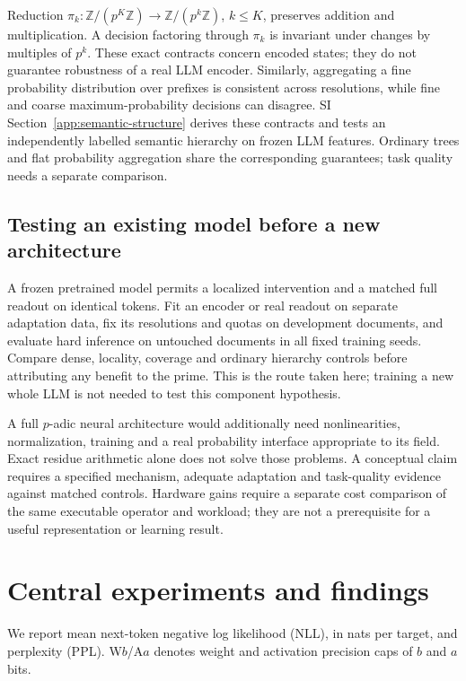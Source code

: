 \documentclass[11pt]{article}
\newcommand{\Z}{\mathbb{Z}}
\begin{document}
Reduction \(\pi_k:\Z/(p^K\Z)\to\Z/(p^k\Z)\), \(k\leq K\),
preserves addition and multiplication. A decision factoring through \(\pi_k\)
is invariant under changes by multiples of \(p^k\). These exact contracts
concern encoded states; they do not guarantee robustness of a real LLM
encoder. Similarly, aggregating a fine probability distribution over prefixes
is consistent across resolutions, while fine and coarse maximum-probability
decisions can disagree. SI Section~\ref{app:semantic-structure} derives these
contracts and tests an independently labelled semantic hierarchy on frozen
LLM features. Ordinary trees and flat probability aggregation share the
corresponding guarantees; task quality needs a separate comparison.

\subsection{Testing an existing model before a new architecture}

A frozen pretrained model permits a localized intervention and a matched
full readout on identical tokens. Fit an encoder or real readout on separate
adaptation data, fix its resolutions and quotas on development documents,
and evaluate hard inference on untouched documents in all fixed training
seeds. Compare dense, locality, coverage and ordinary hierarchy controls
before attributing any benefit to the prime. This is the route taken here;
training a new whole LLM is not needed to test this component hypothesis.

A full \(p\)-adic neural architecture would additionally need nonlinearities,
normalization, training and a real probability interface appropriate to its
field. Exact residue arithmetic alone does not solve those problems.
A conceptual claim requires a specified mechanism, adequate adaptation and
task-quality evidence against matched controls. Hardware gains require a
separate cost comparison of the same executable operator and workload;
they are not a prerequisite for a useful representation or learning result.

\section{Central experiments and findings}
\label{sec:main-results}

We report mean next-token negative log likelihood (NLL), in nats per target,
and perplexity (PPL). W\(b\)/A\(a\) denotes weight and activation precision
caps of \(b\) and \(a\) bits.
\end{document}
